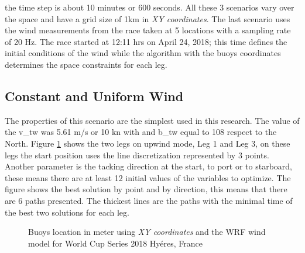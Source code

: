 the time step is about 10 minutes or 600 seconds. All these 3 scenarios vary over the space and have a grid size of 1km in \textit{XY coordinates}. The last scenario uses the wind measurements from the race taken at 5 locations with a sampling rate of 20 Hz. The race started at 12:11 hrs on April 24, 2018; this time defines the initial conditions of the wind while the algorithm with the buoys coordinates determines the space constraints for each leg. %

\subsection{Constant and  Uniform Wind %
}

The properties of this scenario are the simplest used in this research. The value of the  \acrshort{v_tw} was 5.61 m/s or 10 kn with and \acrshort{b_tw} equal to 108 \degree respect to the North. Figure \ref{fig:cnstWind_mtp_upw} shows the two legs on upwind mode, Leg 1 and Leg 3, on these legs the start position uses the line discretization represented by 3 points. Another parameter is the tacking direction at the start, to port or to starboard, these means there are at least 12 initial values of the variables to optimize. The figure shows the best solution by point and by direction, this means that there are 6 paths presented. The thickest lines are the paths with the minimal time of the best two solutions for each leg. \par 

\begin{figure} [hbt!]
  \centering
  \hfill
  \caption{Buoys location in meter using \textit{XY coordinates} and the WRF wind model for World Cup Series 2018 Hyéres, France} %
\label{fig:cnstWind_mtp_upw}
\end{figure}


